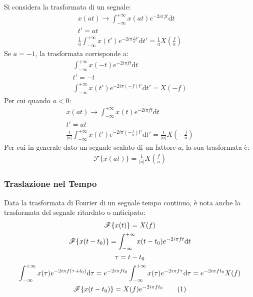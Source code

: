 \documentclass{article}
\newcommand{\df}{\mathrm{d}}
\newcommand{\tageq}{\tag{\stepcounter{equation}\theequation}}
\numberwithin{equation}{subsection}
\begin{document}
Si considera la trasformata di un segnale:
\begin{gather*}
    x(at)\to\displaystyle\int_{-\infty}^{+\infty}x(at)e^{-2i\pi ft}\df t\\
    t'=at\\
    \displaystyle\frac{1}{a}\int_{-\infty}^{+\infty}x(t')e^{-2i\pi \frac{f}{a}t'}\df t'=\frac{1}{a}X\left(\frac{f}{a}\right)
\end{gather*}
Se $a=-1$, la trasformata corrisponde a:
\begin{gather*}
    \displaystyle\int_{-\infty}^{+\infty}x(-t)e^{-2i\pi ft}\df t\\
    t'=-t\\
    \displaystyle\int_{-\infty}^{+\infty}x(t')e^{-2i\pi(- f)t'}\df t'=X(-f)
\end{gather*}
Per cui quando $a<0$:
\begin{gather*}
    x(at)\to\displaystyle\int_{-\infty}^{+\infty}x(t)e^{-2i\pi ft}\df t\\
    t'=at\\
    \displaystyle\frac{1}{|a|}\int_{-\infty}^{+\infty}x(t')e^{-2i\pi \left(-\frac{f}{a}\right)t'}\df t'=\frac{1}{|a|}X\left(-\frac{f}{a}\right)
\end{gather*}
Per cui in generale dato un segnale scalato di un fattore $a$, la sua trasformata è:
\begin{gather}
    \mathscr{F}\{x(at)\}=\displaystyle\frac{1}{|a|}X\left(\frac{f}{a}\right)
\end{gather}

\subsubsection{Traslazione nel Tempo}

Data la trasformata di Fourier di un segnale tempo continuo, è nota anche la trasformata del segnale ritardato o anticipato:
\begin{gather*}
    \mathscr{F}\{x(t)\}=X(f)\\
    \mathscr{F}\{x(t-t_0)\}=\displaystyle\int_{-\infty}^{+\infty}x(t-t_0)e^{-2i\pi ft}\df t\\
    \tau=t-t_0\\
    \displaystyle\int_{-\infty}^{+\infty}x(\tau)e^{-2i\pi f(\tau+t_0)}\df\tau=e^{-2i\pi ft_0}\int_{-\infty}^{+\infty}x(\tau)e^{-2i\pi f\tau}\df\tau=e^{-2i\pi ft_0}X(f)\\
    \mathscr{F}\{x(t-t_0)\}=X(f)e^{-2i\pi ft_0}\tageq
\end{gather*}
\end{document}
